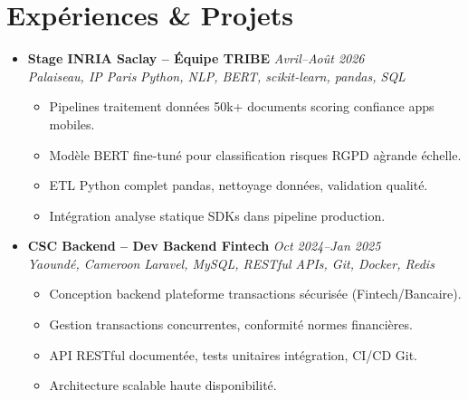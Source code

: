 \documentclass[a4paper,11pt]{article}
\begin{document}
\section{Exp\'eriences \& Projets}
\begin{itemize}[leftmargin=0.5cm, nosep]

    \item \textbf{Stage INRIA Saclay -- \'Equipe TRIBE} \hfill \textit{Avril--Ao\^ut 2026} \\
    \textit{Palaiseau, IP Paris} \hfill \textit{Python, NLP, BERT, scikit-learn, pandas, SQL}
    \vspace{-2pt}
    \begin{itemize}[leftmargin=0.4cm, nosep, label=\tiny$\bullet$]
        \item \small{Pipelines traitement donn\'ees 50k+ documents scoring confiance apps mobiles.}
        \item \small{Mod\`ele BERT fine-tun\'e pour classification risques RGPD a\` grande \'echelle.}
        \item \small{ETL Python complet pandas, nettoyage donn\'ees, validation qualit\'e.}
        \item \small{Int\'egration analyse statique SDKs dans pipeline production.}
    \end{itemize}
    \vspace{3pt}

    \item \textbf{CSC Backend -- Dev Backend Fintech} \hfill \textit{Oct 2024--Jan 2025} \\
    \textit{Yaound\'e, Cameroon} \hfill \textit{Laravel, MySQL, RESTful APIs, Git, Docker, Redis}
    \vspace{-2pt}
    \begin{itemize}[leftmargin=0.4cm, nosep, label=\tiny$\bullet$]
        \item \small{Conception backend plateforme transactions s\'ecuris\'ee (Fintech/Bancaire).}
        \item \small{Gestion transactions concurrentes, conformit\'e normes financi\`eres.}
        \item \small{API RESTful document\'ee, tests unitaires int\'egration, CI/CD Git.}
        \item \small{Architecture scalable haute disponibilit\'e.}
    \end{itemize}
    \vspace{3pt}


\end{itemize}
\end{document}

